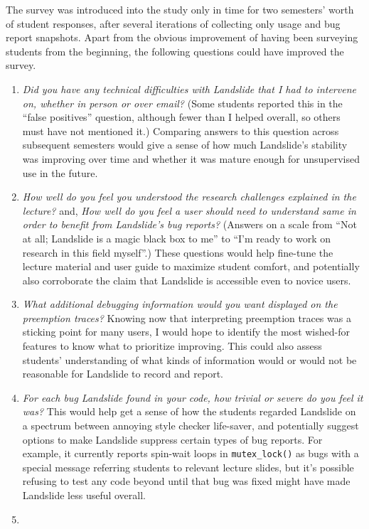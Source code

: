 The survey was introduced into the study only in time for two semesters' worth of student responses,
after several iterations of collecting only usage and bug report snapshots.
Apart from the obvious improvement of having been surveying students from the beginning,
the following questions could have improved the survey.
\begin{enumerate}
	\item {\em Did you have any technical difficulties with Landslide that I had to intervene on,
		whether in person or over email?}
		(Some students reported this in the ``false positives'' question,
		although fewer than I helped overall, so others must have not mentioned it.)
		Comparing answers to this question across subsequent semesters would give a sense
		of how much Landslide's stability was improving over time
		and whether it was mature enough for unsupervised use in the future.
	\item {\em How well do you feel you understood the research challenges explained in the lecture?}
		and,
		{\em How well do you feel a user should need to understand same in order to benefit from Landslide's bug reports?}
		(Answers on a scale from ``Not at all; Landslide is a magic black box to me''
		to ``I'm ready to work on research in this field myself''.)
		These questions would help fine-tune the lecture material and user guide to maximize student comfort,
		and potentially also corroborate the claim that Landslide is accessible even to novice users.
	\item {\em What additional debugging information would you want displayed on the preemption traces?}
		Knowing now that interpreting preemption traces was a sticking point for many users,
		I would hope to identify the most wished-for features to know what to prioritize improving.
		This could also assess students' understanding of what kinds of information
		would or would not be reasonable for Landslide to record and report.
	\item {\em For each bug Landslide found in your code, how trivial or severe do you feel it was?}
		This would help get a sense of how the students regarded Landslide
		on a spectrum between annoying style checker  life-saver,
		and potentially suggest options to make Landslide suppress certain types of bug reports.
		For example, it currently reports spin-wait loops in {\tt mutex\_lock()} as bugs
		with a special message referring students to relevant lecture slides,
		but it's possible refusing to test any code beyond until that bug was fixed
		might have made Landslide less useful overall.
	\item {}
\end{enumerate}

